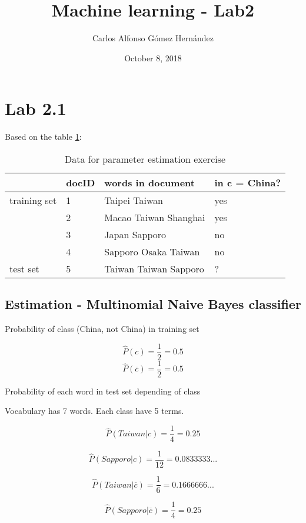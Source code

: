 \documentclass{article}
\title{Machine learning - Lab2}
\author{Carlos Alfonso Gómez Hernández}
\date{October 8, 2018}
\begin{document}
\maketitle

\section{Lab 2.1}

{Based on the table \ref{table:13.10}: }

\begin{table}[h]
\begin{center}
\begin{tabular}{@{}llll@{}}
	\hline
             & docID & words in document     & in c = China? \\ \hline
training set & 1     & Taipei Taiwan         & yes           \\
             & 2     & Macao Taiwan Shanghai & yes           \\
             & 3     & Japan Sapporo         & no            \\
             & 4     & Sapporo Osaka Taiwan  & no            \\
test set     & 5     & Taiwan Taiwan Sapporo & ?             \\
\hline
\end{tabular}
\caption{Data for parameter estimation exercise}
\label{table:13.10}
\end{center}
\end{table}


\subsection{Estimation - Multinomial Naive Bayes classifier}

Probability of class (China, not China) in training set

$$\hat{P}(c) = \frac{1}{2} = 0.5$$
$$\hat{P}(\overline{c}) = \frac{1}{2} = 0.5$$

Probability of each word in test set depending of class

Vocabulary has 7 words. Each class have 5 terms.

\[\hat{P}(Taiwan|c) = \frac{1}{4} = 0.25\]

\[\hat{P}(Sapporo|c) = \frac{1}{12} = 0.0833333...\]

\[\hat{P}(Taiwan|\overline{c}) = \frac{1}{6} = 0.1666666...\]

\[\hat{P}(Sapporo|\overline{c})  = \frac{1}{4} = 0.25\]
\end{document}
